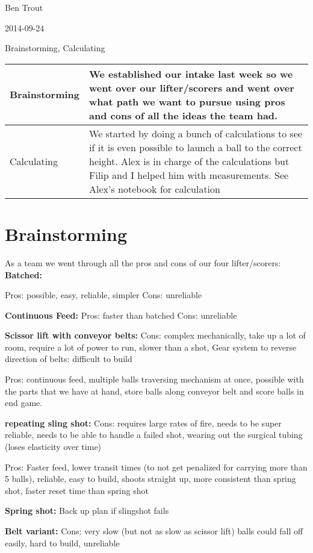 Ben Trout

2014-09-24

Brainstorming, Calculating

\begin{tabular}{|p{5cm}|p{5cm}|}
 \hline
 Brainstorming&
 We established our intake last week so we went over our lifter/scorers and went over what path we want to pursue using pros and cons of all the ideas the team had.
 \\
 \hline
 Calculating&  
 We started by doing a bunch of calculations to see if it is even possible to launch a ball to the correct height. Alex is in charge of the calculations but Filip and I helped  him with measurements. See Alex’s notebook for calculation
 \\
 \hline
\end{tabular}

\section*{Brainstorming}
As a team we went through all the pros and cons of our four lifter/scorers: 
\textbf{Batched:}

Pros: possible, easy, reliable, simpler
Cons: unreliable

\textbf{Continuous Feed:}
Pros: faster than batched
Cons: unreliable

\textbf{Scissor lift with conveyor belts:}
Cons: complex mechanically, take up a lot of room, require a lot of power to run, slower than a shot, Gear system to reverse direction of belts: difficult to build

Pros: continuous feed, multiple balls traversing mechanism at once, possible with the parts that we have at hand, store balls along conveyor belt and score balls in end game. 

\textbf{repeating sling shot:}
Cons: requires large rates of fire, needs to be super reliable, needs to be able to handle a failed shot, wearing out the surgical tubing (loses elasticity over time) 

Pros: Faster feed, lower transit times (to not get penalized for carrying more than 5 balls), reliable, easy to build, shoots straight up, more consistent than spring shot, faster reset time than spring shot

\textbf{Spring shot:}
 Back up plan if slingshot fails

\textbf{Belt variant:}
Cons: very slow (but not as slow as scissor lift)  balls could fall off easily, hard to build, unreliable

